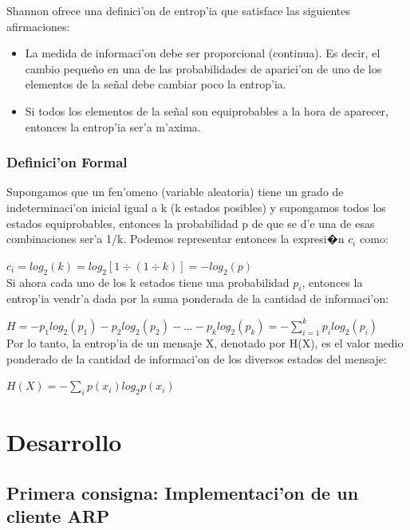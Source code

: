 \documentclass[a4paper,10pt]{article}
\begin{document}
\vspace*{5 mm}
Shannon ofrece una definici'on de entrop'ia que satisface las siguientes afirmaciones:

\begin{itemize}
	\item La medida de informaci'on debe ser proporcional (continua). Es decir, el cambio peque\~no en una de las probabilidades de aparici'on de uno de los elementos de la se\~nal debe cambiar poco la entrop'ia.
	\item Si todos los elementos de la se\~nal son equiprobables a la hora de aparecer, entonces la entrop'ia ser'a m'axima.	
\end{itemize}

\subsubsection{Definici'on Formal}

Supongamos que un fen'omeno (variable aleatoria) tiene un grado de indeterminaci'on inicial igual a k (k estados posibles) y supongamos todos los estados equiprobables, entonces la probabilidad p de que se d'e una de esas combinaciones ser'a 1/k. Podemos representar entonces la expresi�n  $c_{i}$ como:

\vspace*{5 mm}
$c_{i} = log_{2}(k) = log_{2}\left[ 1 \div (1 \div k)\right] = -log_{2}(p)$
\\

Si ahora cada uno de los k estados tiene una probabilidad $p_{i}$, entonces la entrop'ia vendr'a dada por la suma ponderada de la cantidad de informaci'on:

\vspace*{5 mm}
$H = -p_{1}log_{2}(p_{1}) - p_{2}log_{2}(p_{2}) - ... -p_{k}log_{2}(p_{k}) = -\sum^{k}_{i=1} p_{i}log_{2}(p_{i})$
\\

Por lo tanto, la entrop'ia de un mensaje X, denotado por H(X), es el valor medio ponderado de la cantidad de informaci'on de los diversos estados del mensaje:

\vspace*{5 mm}
$H(X) = -\sum_{i} p(x_{i})log_{2}p(x_{i})$
\\

\section{Desarrollo}
\label{desarrollo1:}
\subsection{Primera consigna: Implementaci'on de un cliente ARP}
\label{expli1:}
\end{document}
